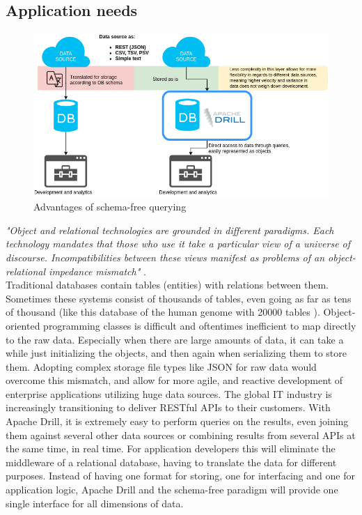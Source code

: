 \documentclass[a4paper,english]{report}
\begin{document}
			\subsection{Application needs}
			\begin{figure}[H]
					\includegraphics[width=\textwidth]{drill_advantages}
					\caption{Advantages of schema-free querying}
			\end{figure}
			\textit{"Object and relational technologies are grounded in
			different paradigms. Each technology mandates that
			those who use it take a particular view of a universe
			of discourse. Incompatibilities between these views
			manifest as problems of an object-relational
			impedance mismatch"} \cite{impedance}.
			\\
			Traditional databases contain tables (entities) with relations between them. Sometimes these systems consist of thousands of tables, even going as far as tens of thousand (like this database of the human genome with 20000 tables \cite{humangenome}). Object-oriented programming classes is difficult and oftentimes inefficient to map directly to the raw data. Especially when there are large amounts of data, it can take a while just initializing the objects, and then again when serializing them to store them. Adopting complex storage file types like JSON for raw data would overcome this mismatch, and allow for more agile, and reactive development of enterprise applications utilizing huge data sources. The global IT industry is increasingly transitioning to deliver RESTful APIs to their customers. With Apache Drill, it is extremely easy to perform queries on the results, even joining them against several other data sources or combining results from several APIs at the same time, in real time. For application developers this will eliminate the middleware of a relational database, having to translate the data for different purposes. Instead of having one format for storing, one for interfacing and one for application logic, Apache Drill and the schema-free paradigm will provide one single interface for all dimensions of data.
		
\end{document}

